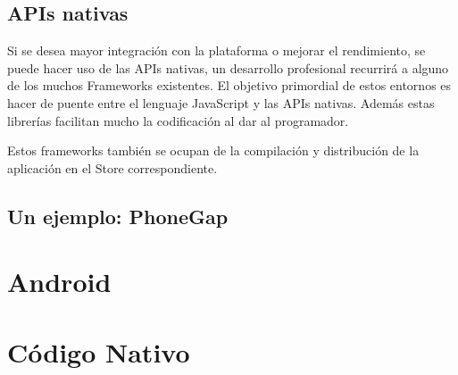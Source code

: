 \documentclass[
10pt, %
a4paper, %
oneside, %
headinclude,footinclude, %
BCOR5mm, %
]{scrartcl}
\begin{document}
\subsection{APIs nativas}
Si se desea mayor integración con la plataforma o mejorar el rendimiento, se puede hacer uso de las APIs nativas, un desarrollo profesional recurrirá a alguno de los muchos Frameworks existentes. El objetivo primordial de estos entornos es hacer de puente entre el lenguaje JavaScript y las APIs nativas. Además estas librerías facilitan mucho la codificación al dar al programador.

Estos frameworks también se ocupan de la compilación y distribución de la aplicación en el Store correspondiente.
\subsection{Un ejemplo: PhoneGap}

\section{Android}

\section{Código Nativo}
\end{document}
